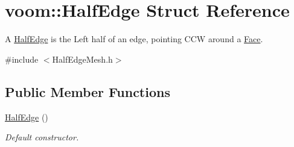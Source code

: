 \hypertarget{structvoom_1_1_half_edge}{
\section{voom::HalfEdge Struct Reference}
\label{structvoom_1_1_half_edge}
}


A \hyperlink{structvoom_1_1_half_edge}{HalfEdge} is the Left half of an edge, pointing CCW around a \hyperlink{structvoom_1_1_face}{Face}.  


{\ttfamily \#include $<$HalfEdgeMesh.h$>$}\subsection*{Public Member Functions}
\begin{DoxyCompactItemize}
\item 
\hypertarget{structvoom_1_1_half_edge_a8b3611e185273277e4343770558edd60}{
\hyperlink{structvoom_1_1_half_edge_a8b3611e185273277e4343770558edd60}{HalfEdge} ()}
\label{structvoom_1_1_half_edge_a8b3611e185273277e4343770558edd60}

\begin{DoxyCompactList}\small\item\em Default constructor. \item\end{DoxyCompactList}\end{DoxyCompactItemize}

